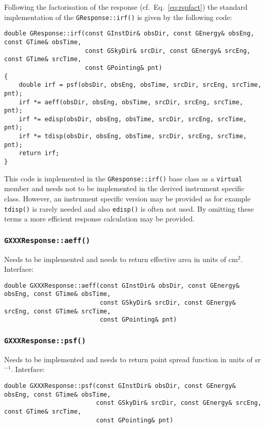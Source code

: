\documentclass{article}[12pt,a4]
\begin{document}
Following the factorisation of the response (cf.~Eq.~\ref{eq:rspfact}) the standard implementation
of the {\tt GResponse::irf()} is given by the following code:
\begin{verbatim}
double GResponse::irf(const GInstDir& obsDir, const GEnergy& obsEng, const GTime& obsTime,
                      const GSkyDir& srcDir, const GEnergy& srcEng, const GTime& srcTime,
                      const GPointing& pnt)
{
    double irf = psf(obsDir, obsEng, obsTime, srcDir, srcEng, srcTime, pnt);
    irf *= aeff(obsDir, obsEng, obsTime, srcDir, srcEng, srcTime, pnt);
    irf *= edisp(obsDir, obsEng, obsTime, srcDir, srcEng, srcTime, pnt);
    irf *= tdisp(obsDir, obsEng, obsTime, srcDir, srcEng, srcTime, pnt);
    return irf;
}
\end{verbatim}
This code is implemented in the {\tt GResponse::irf()} base class as a {\tt virtual} member and
needs not to be implemented in the derived instrument specific class.
However, an instrument specific version may be provided as for example {\tt tdisp()} is rarely
needed and also {\tt edisp()} is often not used.
By omitting these terms a more efficient response calculation may be provided.


\subsubsection{{\tt GXXXResponse::aeff()}}

Needs to be implemented and needs to return effective area in units of cm$^2$.
Interface:
\begin{verbatim}
double GXXXResponse::aeff(const GInstDir& obsDir, const GEnergy& obsEng, const GTime& obsTime,
                          const GSkyDir& srcDir, const GEnergy& srcEng, const GTime& srcTime,
                          const GPointing& pnt)
\end{verbatim}


\subsubsection{{\tt GXXXResponse::psf()}}

Needs to be implemented and needs to return point spread function in units of sr$^{-1}$.
Interface:
\begin{verbatim}
double GXXXResponse::psf(const GInstDir& obsDir, const GEnergy& obsEng, const GTime& obsTime,
                         const GSkyDir& srcDir, const GEnergy& srcEng, const GTime& srcTime,
                         const GPointing& pnt)
\end{verbatim}
\end{document}
